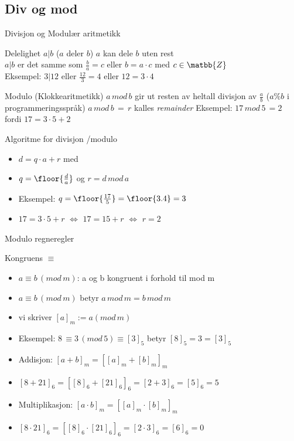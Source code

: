 \subsection*{Div og mod}

\begin{frame}{Divisjon og Modulær aritmetikk}
\begin{block}{Delelighet $a|b$ ($a$ deler $b$)}
$a$ kan dele $b$ uten rest\\
$a|b$ er det samme som $\frac{b}{a}=c$ eller $b=a\cdot c$ med $c \in \matbb{Z}$\\
Eksempel: $3|12$ eller $\frac{12}{3} = 4$ eller $12=3\cdot 4$
\end{block}
\pause
\begin{block}{Modulo (Klokkearitmetikk)}
$a\, mod\, b$ gir ut resten av heltall divisjon av $\frac{a}{b}$ ($a\%b$ i programmeringsspråk)
$a\, mod\, b\, =\, r$ kalles \textit{remainder}
Eksempel: $17\, mod\, 5\, = 2$ fordi $17=3\cdot 5+2$ 
\end{block}
\end{frame}

\begin{frame}[fragile]{Algoritme for divisjon /modulo}
\begin{itemize}[<+->]
\item $d=q\cdot a + r$ med
\item $q=\floor{\frac{d}{a}}$ og $r=d\, mod\, a$
\item Eksempel: $q=\floor{\frac{17}{5}} = \floor{3.4}=3$
\item $17=3\cdot 5 + r$ $\iff$ $17=15+r$ $\iff$ $r=2$
\end{itemize}
\end{frame}

\begin{frame}{Modulo regneregler}
\begin{block}{Kongruens $\equiv$}
\begin{itemize}
\item $a \equiv b\, (mod\, m)$: a og b kongruent i forhold til mod m
\item $a \equiv b\, (mod\, m)$ betyr $a\, mod\, m=b\, mod\, m$
\item vi skriver $[a]_m := a (mod\, m)$
\item Eksempel: $8\, \equiv 3\, (mod\, 5) \equiv [3]_5$ betyr $[8]_5=3=[3]_5$ 
\end{itemize}
\end{block}
\pause
\begin{itemize}[<+->]
\item Addisjon: $[a+b]_m = [[a]_m + [b]_m]_m$
\item $[8+21]_6 = [[8]_6 + [21]_6]_6 = [2 + 3]_6 = [5]_6 = 5$
\item Multiplikasjon: $[a\cdot b]_m = [[a]_m \cdot [b]_m]_m$
\item $[8 \cdot 21]_6 = [[8]_6 \cdot [21]_6]_6 = [2 \cdot 3]_6 = [6]_6 = 0$
\end{itemize}
\end{frame}

